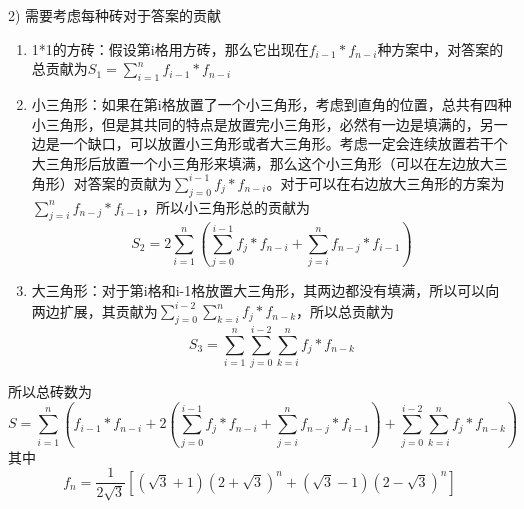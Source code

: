 \documentclass[a4paper]{article}
\begin{document}
\begin{enumerate}[]
\begin{solution}
    2) 需要考虑每种砖对于答案的贡献
    \begin{enumerate}
        \item 1*1的方砖：假设第i格用方砖，那么它出现在$f_{i-1} * f_{n-i}$种方案中，对答案的总贡献为$S_1 =\sum_{i=1}^{n} f_{i-1} * f_{n-i}$
        \item 小三角形：如果在第i格放置了一个小三角形，考虑到直角的位置，总共有四种小三角形，但是其共同的特点是放置完小三角形，必然有一边是填满的，另一边是一个缺口，可以放置小三角形或者大三角形。考虑一定会连续放置若干个大三角形后放置一个小三角形来填满，那么这个小三角形（可以在左边放大三角形）对答案的贡献为$\sum_{j=0}^{i-1} f_j*f_{n-i}$。对于可以在右边放大三角形的方案为$\sum_{j=i}^{n} f_{n-j}*f_{i-1}$，所以小三角形总的贡献为
        \begin{equation*}
            S_2 = 2 \sum_{i=1} ^ n (\sum_{j=0}^{i-1} f_j*f_{n-i} + \sum_{j=i}^{n} f_{n-j}*f_{i-1})
        \end{equation*}

        \item 大三角形：对于第i格和i-1格放置大三角形，其两边都没有填满，所以可以向两边扩展，其贡献为$\sum_{j=0} ^ {i-2} \sum_{k=i}^n f_j * f_{n-k}$，所以总贡献为
        \begin{equation*}
            S_3 = \sum_{i=1} ^ n \sum_{j=0} ^ {i-2} \sum_{k=i}^n f_j * f_{n-k}
        \end{equation*}
    \end{enumerate}
    所以总砖数为
    \begin{equation*}
        S = \sum_{i=1}^{n} ( f_{i-1} * f_{n-i} + 2(\sum_{j=0}^{i-1} f_j*f_{n-i} + \sum_{j=i}^{n} f_{n-j}*f_{i-1}) + \sum_{j=0} ^ {i-2} \sum_{k=i}^n f_j * f_{n-k})
    \end{equation*}
    其中
    \begin{equation*}
        f_n =\frac{1}{2\sqrt{3}} [ (\sqrt{3}+1)(2+\sqrt{3})^{n} + (\sqrt{3}-1)(2-\sqrt{3})^{n}]
    \end{equation*}
    
\end{solution}

\end{enumerate}
\end{document}
